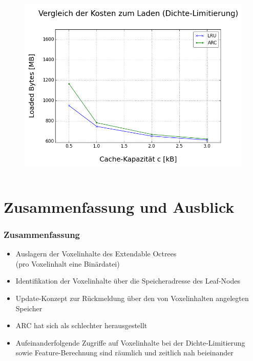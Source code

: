 \documentclass[presentation]{beamer}
\newcommand{ 
\OutlineAtBeginSection}{
	\AtBeginSection[]
	{
		\begin{frame}{Überblick}
		\tableofcontents[currentsection]
		\end{frame}
	}
}
\begin{document}
\begin{frame}
\begin{columns}[c]
\begin{figure}
	\includegraphics[width=1\linewidth]{figures/results/DensityLimitationSwapLoadCosts.png}
	\caption{}
	\label{fig:sub9}
	\end{figure}
\end{columns}
\end{frame} 

\OutlineAtBeginSection
\section{Zusammenfassung und Ausblick}
\begin{frame}
	\frametitle{Zusammenfassung}
	\begin{itemize}
		\item Auslagern der Voxelinhalte des Extendable Octrees\\(pro Voxelinhalt eine Binärdatei)
		\item Identifikation der Voxelinhalte über die Speicheradresse des Leaf-Nodes
		\item Update-Konzept zur Rückmeldung über den von Voxelinhalten angelegten Speicher
		\item ARC hat sich als schlechter herausgestellt
		\item Aufeinanderfolgende Zugriffe auf Voxelinhalte bei der Dichte-Limitierung sowie Feature-Berechnung sind räumlich und zeitlich nah beieinander
	\end{itemize} 
\end{frame}
 
\end{document}
